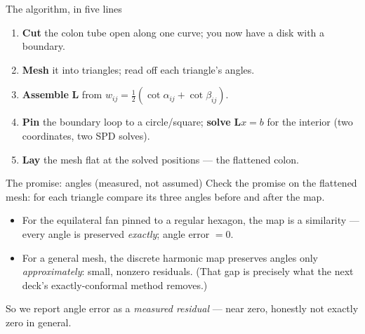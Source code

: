 \documentclass[aspectratio=169,10pt]{beamer}
\newcommand{\half}{\tfrac{1}{2}}
\newcommand{\Lmat}{\mathbf{L}}
\begin{document}
\begin{frame}{The algorithm, in five lines}
  \begin{enumerate}
    \item \textbf{Cut} the colon tube open along one curve; you now have a disk with a boundary.
    \item \textbf{Mesh} it into triangles; read off each triangle's angles.
    \item \textbf{Assemble} $\Lmat$ from $w_{ij}=\half(\cot\alpha_{ij}+\cot\beta_{ij})$.
    \item \textbf{Pin} the boundary loop to a circle/square; \textbf{solve} $\Lmat x=b$ for the interior (two coordinates, two SPD solves).
    \item \textbf{Lay} the mesh flat at the solved positions --- the flattened colon.
  \end{enumerate}
\end{frame}


\begin{frame}{The promise: angles (measured, not assumed)}
  Check the promise on the flattened mesh: for each triangle compare its three angles before and after the map.
  \begin{itemize}
    \item For the equilateral fan pinned to a regular hexagon, the map is a similarity --- every angle is preserved \emph{exactly}; angle error $=0$.
    \item For a general mesh, the discrete harmonic map preserves angles only \emph{approximately}: small, nonzero residuals. (That gap is precisely what the next deck's exactly-conformal method removes.)
  \end{itemize}
  So we report angle error as a \emph{measured residual} --- near zero, honestly not exactly zero in general.
\end{frame}
\end{document}
